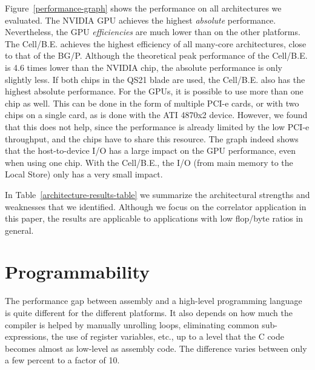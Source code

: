 \documentclass{article}
\begin{document}
Figure~\ref{performance-graph} shows the performance on all
architectures we evaluated. The NVIDIA GPU achieves the highest
\emph{absolute} performance. Nevertheless, the GPU \emph{efficiencies}
are much lower than on the other platforms.  The \mbox{Cell/B.E.}
achieves the highest efficiency of all many-core architectures, close
to that of the BG/P. Although the theoretical peak performance of the
\mbox{Cell/B.E.} is 4.6 times lower than the NVIDIA chip, the absolute
performance is only slightly less.  If both chips in the QS21 blade
are used, the \mbox{Cell/B.E.} also has the highest absolute
performance. For the GPUs, it is possible to use more than one chip as
well.  This can be done in the form of multiple PCI-e cards, or with
two chips on a single card, as is done with the ATI 4870x2
device. However, we found that this does not help, since the
performance is already limited by the low PCI-e throughput, and the
chips have to share this resource.
The graph indeed shows that the
host-to-device I/O has a large impact on the GPU performance, even when using one chip.  With
the \mbox{Cell/B.E.}, the I/O (from main memory to the Local Store) only has a very small impact.

In Table~\ref{architecture-results-table} we summarize the
architectural strengths and weaknesses that we identified.  Although
we focus on the correlator application in this paper, the
results are applicable to applications with low flop/byte ratios in
general.


\section{Programmability}

The performance gap between assembly and a high-level programming language 
is quite different for the different platforms. It also
depends on how much the compiler is helped by manually unrolling
loops, eliminating common sub-expressions, the use of register variables,
etc., up to a level that the C code becomes almost as low-level as assembly
code. The difference varies between only a few percent to a factor of 10. 
\end{document}
